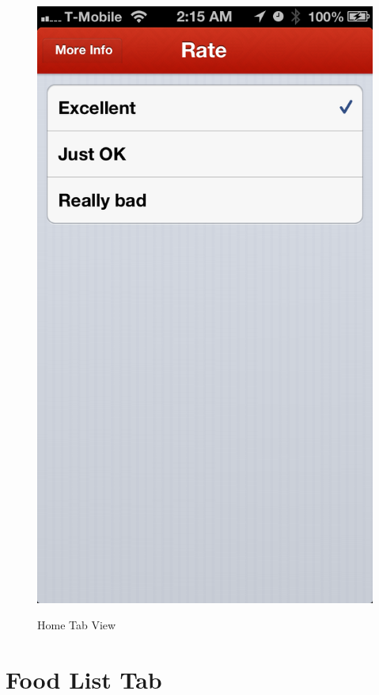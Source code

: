 \begin{figure}
{	\includegraphics[width=\figwidth, totalheight=\figheight, keepaspectratio]{./screenshots/home-rate.png}} \hfill
	\caption{Home Tab View}
	\label{fig:hometab}
\end{figure}




\section{Food List Tab} %
\label{sec:foodie_list_tab}

